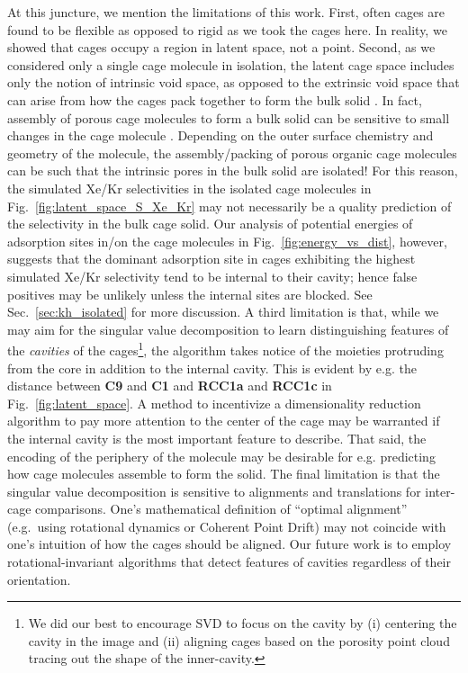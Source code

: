 \documentclass[journal=jacsat,manuscript=article,layout=traditional]{achemso}
\begin{document}
At this juncture, we mention the limitations of this work. First, often cages are found to be flexible \cite{chen2014separation,camp2016transition,holden2014gas,holden2016understanding} as opposed to rigid as we took the cages here. {\color{red} In reality, we showed that cages occupy a region in latent space, not a point.} Second, as we considered only a single cage molecule in isolation, the latent cage space includes only the notion of intrinsic void space, as opposed to the extrinsic void space that can arise from how the cages pack together to form the bulk solid \cite{hasell2016porous}. In fact, assembly of porous cage molecules to form a bulk solid can be sensitive to small changes in the cage molecule \cite{hasell2014controlling}. Depending on the outer surface chemistry and geometry of the molecule, the assembly/packing of porous organic cage molecules can be such that the intrinsic pores in the bulk solid are isolated!\cite{tozawa2009porous} {\color{red} For this reason, the simulated Xe/Kr selectivities in the isolated cage molecules in Fig.~\ref{fig:latent_space_S_Xe_Kr} may not necessarily be a quality prediction of the selectivity in the bulk cage solid. Our analysis of potential energies of adsorption sites in/on the cage molecules in Fig.~\ref{fig:energy_vs_dist}, however, suggests that the dominant adsorption site in cages exhibiting the highest simulated Xe/Kr selectivity tend to be internal to their cavity; hence false positives may be unlikely unless the internal sites are blocked. See Sec.~\ref{sec:kh_isolated} for more discussion.} A third limitation is that, while we may aim for the singular value decomposition to learn distinguishing features of the \emph{cavities} of the cages\footnote{\color{red} We did our best to encourage SVD to focus on the cavity by (i) centering the cavity in the image and (ii) aligning cages based on the porosity point cloud tracing out the shape of the inner-cavity.}, the algorithm takes notice of the moieties protruding from the core in addition to the internal cavity. {\color{red} This is evident by e.g. the distance between \textbf{C9} and \textbf{C1} and \textbf{RCC1a} and \textbf{RCC1c} in Fig.~\ref{fig:latent_space}.} A method to incentivize a dimensionality reduction algorithm to pay more attention to the center of the cage may be warranted if the internal cavity is the most important feature to describe. That said, the encoding of the periphery of the molecule may be desirable for e.g. predicting how cage molecules assemble to form the solid. The final limitation is that the singular value decomposition is sensitive to alignments and translations for inter-cage comparisons. {\color{red} One's mathematical definition of ``optimal alignment'' (e.g.\ using rotational dynamics or Coherent Point Drift) may not coincide with one's intuition of how the cages should be aligned. Our future work is to employ rotational-invariant algorithms that detect features of cavities regardless of their orientation.}
\end{document}
